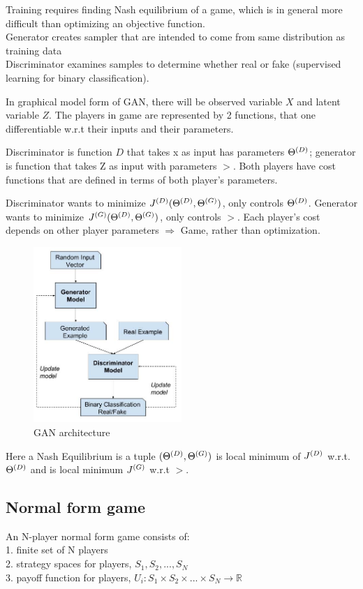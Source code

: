 \documentclass[12pt,a4paper]{article}
\begin{document}
Training requires finding Nash equilibrium of a game, which is in general more difficult than optimizing an objective function. \\
Generator creates sampler that are intended to come from same distribution as training data\\ 
Discriminator examines samples to determine whether real or fake (supervised learning for binary classification).

In graphical model form of GAN, there will be observed variable $X$ and latent variable $Z$. The players in game are represented by 2 functions, that one differentiable w.r.t their inputs and their parameters. 

Discriminator is function $D$ that takes x as input has parameters ${\Theta^{(D)}}$; generator is function that takes Z as input with parameters $\gt$. 
Both players have cost functions that are defined in terms of both player's parameters. 

Discriminator wants to minimize $J^{(D)}({\Theta^{(D)}},{\Theta^{(G)}})$, only controls ${\Theta^{(D)}}$. Generator wants to minimize $J^{(G)}({\Theta^{(D)}},{\Theta^{(G)}})$, only controls $\gt$. 
Each player's cost depends on other player parameters $\Rightarrow$ Game, rather than optimization. 

\begin{figure}[!ht]
    \centering
    \includegraphics[width=0.5\textwidth]{fig/gan_arch.jpg}
    \caption{GAN architecture}
\end{figure}

Here a Nash Equilibrium is a tuple $({\Theta^{(D)}}, {\Theta^{(G)}})$ is local minimum of $J^{(D)}$ w.r.t. ${\Theta^{(D)}}$ and is local minimum $J^{(G)}$ w.r.t $\gt$. 

\subsection{Normal form game}
An N-player normal form game consists of:\\
1. finite set of N players\\
2. strategy spaces for players, $S_1, S_2, ..., S_N$\\
3. payoff function for players, $U_i: S_1\times S_2\times...\times S_N\rightarrow \mathbb{R}$
\end{document}
